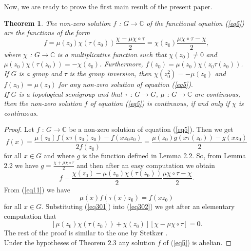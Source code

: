 \documentclass[12pt]{amsart}
\newtheorem{thm}{Theorem}[section]
\theoremstyle{definition}
\theoremstyle{remark}
\numberwithin{equation}{section}
\begin{document}
Now, we are ready to prove the first main result of the present
paper.
\begin{thm} The non-zero solution $f$ : $G\longrightarrow \mathbb{C}$ of
the functional equation (\ref{eq5}) are the functions of the form
\begin{equation}\label{eq300}
    f=\mu(z_0)\chi(\tau(z_0))\frac{\chi-\mu\chi\circ\tau}{2}=\chi(z_0)\frac{\mu\chi\circ\tau-\chi}{2},
\end{equation}where $\chi$ : $G\longrightarrow \mathbb{C}$ is a
multiplicative function such that $\chi(z_0)\neq 0$ and
$\mu(z_0)\chi(\tau(z_0))=-\chi(z_0)$. Furthermore,
$f(z_0)=\mu(z_0)\chi(z_0\tau(z_0))$.\\If $G$ is a group and $\tau$
is the group inversion, then $\chi(z_{0}^{2})=-\mu(z_0)$ and
$f(z_0)=\mu(z_0)$ for any non-zero solution of equation
(\ref{eq5}).\\If $G$ is a topological semigroup and that $\tau$ :
$G\longrightarrow G$, $\mu$ : $G\longrightarrow \mathbb{C}$ are
continuous, then the non-zero solution $f$ of equation (\ref{eq5})
is continuous, if and only if $\chi$ is continuous.
\end{thm}\begin{proof}Let $f$ : $G\longrightarrow \mathbb{C}$ be a non-zero solution of equation (\ref{eq5}). Then we get
$$f(x)=\frac{\mu(z_0)f(x\tau(z_0)z_0)-f(xz_0z_0)}{2f(z_0)}=\frac{\mu(z_0)g(x\tau(z_0))-g(xz_0)}{2}$$ for all $x\in G$
and where $g$ is the function defined in Lemma 2.2. So, from Lemma
2.2 we have $g=\frac{\chi+\mu\chi\circ\tau}{2}$ and then after an
easy computation we obtain
\begin{equation}\label{eq301}
    f=\frac{\chi(z_0)-\mu(z_0)\chi(\tau(z_0))}{2}\frac{\mu\chi\circ\tau-\chi}{2}.
\end{equation} From (\ref{eq11}) we have
\begin{equation}\label{eq302}
\mu(x)f(\tau(x)z_0)=f(xz_0)\end{equation}
 for all $x\in G$.
Substituting  (\ref{eq301})  into (\ref{eq302}) we get after an
elementary computation that
$$[\mu(z_0)\chi(\tau(z_0))+\chi(z_0)][\chi-\mu\chi\circ\tau]=0.$$ The rest of
the proof is similar to the one  by Stetk\ae r \cite{St3}.\\ Under
the hypotheses of Theorem 2.3 any solution $f$ of (\ref{eq5}) is
abelian.
\end{proof}
\end{document}
